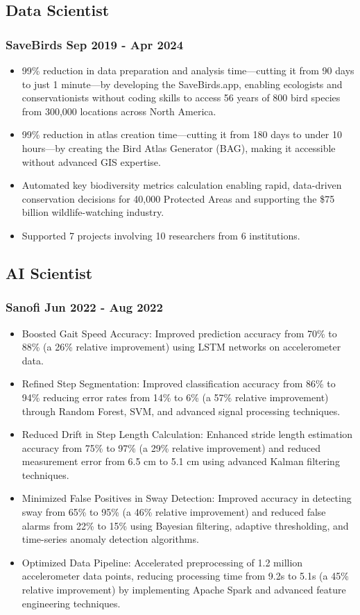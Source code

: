 \documentclass[11pt]{article}
\begin{document}
\subsection{Data Scientist}
\subsubsection{SaveBirds \hfill Sep 2019 - Apr 2024}
\begin{itemize}[itemsep=5pt]
	\item 99\% reduction in data preparation and analysis time—cutting it from 90 days to just 1 minute—by developing the SaveBirds.app, enabling ecologists and conservationists without coding skills to access 56 years of 800 bird species from 300,000 locations across North America.
	\item 99\% reduction in atlas creation time—cutting it from 180 days to under 10 hours—by creating the Bird Atlas Generator (BAG), making it accessible without advanced GIS expertise.
	\item Automated key biodiversity metrics calculation enabling rapid, data-driven conservation decisions for 40,000 Protected Areas and supporting the \$75 billion wildlife-watching industry.
	\item Supported 7 projects involving 10 researchers from 6 institutions.
\end{itemize}

\subsection{AI Scientist}
\subsubsection{Sanofi \hfill Jun 2022 - Aug 2022}
\begin{itemize}[itemsep=5pt]
	\item Boosted Gait Speed Accuracy: Improved prediction accuracy from 70\% to 88\% (a 26\% relative improvement) using LSTM networks on accelerometer data.
	\item Refined Step Segmentation: Improved classification accuracy from 86\% to 94\% reducing error rates from 14\% to 6\% (a 57\% relative improvement) through Random Forest, SVM, and advanced signal processing techniques.
	\item Reduced Drift in Step Length Calculation: Enhanced stride length estimation accuracy from 75\% to 97\% (a 29\% relative improvement) and reduced measurement error from 6.5 cm to 5.1 cm using advanced Kalman filtering techniques.
	\item Minimized False Positives in Sway Detection: Improved accuracy in detecting sway from 65\% to 95\% (a 46\% relative improvement) and reduced false alarms from 22\% to 15\% using Bayesian filtering, adaptive thresholding, and time-series anomaly detection algorithms.
	\item Optimized Data Pipeline: Accelerated preprocessing of 1.2 million accelerometer data points, reducing processing time from 9.2s to 5.1s (a 45\% relative improvement) by implementing Apache Spark and advanced feature engineering techniques.
\end{itemize}
\end{document}
